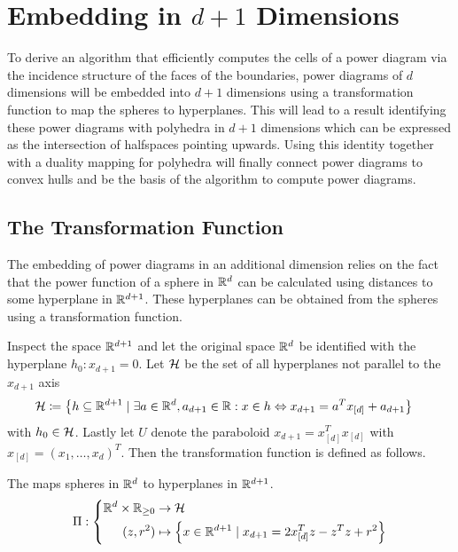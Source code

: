 \section{Embedding in \texorpdfstring{$d+1$}{d+1} Dimensions}
\label{sec:embedding_in_d_1_dimensions}
To derive an algorithm that efficiently computes the cells of a power diagram via the incidence structure of the faces of the boundaries, power diagrams of $d$ dimensions will be embedded into $d+1$ dimensions using a transformation function to map the spheres to hyperplanes.
This will lead to a result identifying these power diagrams with polyhedra in $d+1$ dimensions which can be expressed as the intersection of halfspaces pointing upwards.
Using this identity together with a duality mapping for polyhedra will finally connect power diagrams to convex hulls and be the basis of the algorithm to compute power diagrams.

\subsection{The Transformation Function}
\label{sub:the_transform}
The embedding of power diagrams in an additional dimension relies on the fact that the power function of a sphere in $\mathbb{R}^d$ can be calculated using distances to some hyperplane in $\mathbb{R}^{d+1}$.
These hyperplanes can be obtained from the spheres using a transformation function.

Inspect the space $\mathbb{R}^{d+1}$ and let the original space $\mathbb{R}^d$ be identified with the hyperplane $h_0: x_{d+1} = 0$.
Let $\mathcal{H}$ be the set of all hyperplanes not parallel to the $x_{d+1}$ axis
\begin{align}
    \mathcal{H} &\coloneqq \left\{ h \subseteq \mathbb{R}^{d+1} \mid \exists a \in \mathbb{R}^d, a_{d+1} \in \mathbb{R} : x \in h \Leftrightarrow x_{d+1} = a^Tx_{[d]} + a_{d+1} \right\}
\end{align}
with $h_0 \in \mathcal{H}$.
Lastly let $U$ denote the paraboloid $x_{d+1} = x_{[d]}^Tx_{[d]}$ with $x_{[d]} = \left( x_1, \dots, x_d \right)^T$.
Then the transformation function is defined as follows.

\begin{definition}
    The  maps spheres in $\mathbb{R}^d$ to hyperplanes in $\mathbb{R}^{d+1}$.
    \begin{align}
        \Pi: \left\{\begin{aligned}
            \mathbb{R}^{d} \times \mathbb{R}_{\geq 0} &\to \mathcal{H}\\
            (z, r^2) &\mapsto \left\{ x \in \mathbb{R}^{d+1} \mid x_{d+1} = 2x_{[d]}^Tz - z^Tz + r^2 \right\}
        \end{aligned}\right.
    \end{align}
\end{definition}

